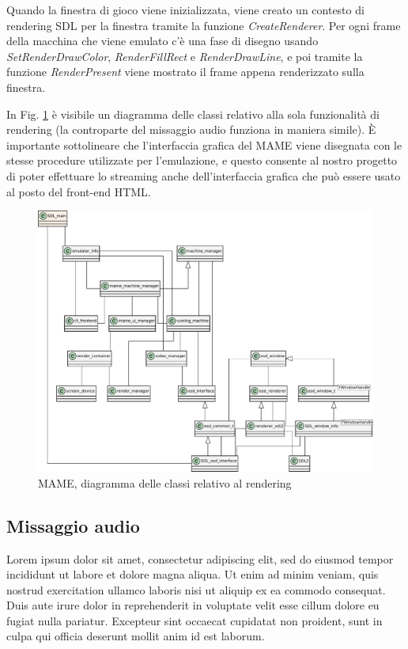Quando la finestra di gioco viene inizializzata, viene creato un contesto di rendering SDL per la finestra tramite la funzione \textit{CreateRenderer}. Per ogni frame della macchina che viene emulato c'è una fase di disegno usando \textit{SetRenderDrawColor}, \textit{RenderFillRect} e \textit{RenderDrawLine}, e poi tramite la funzione \textit{RenderPresent} viene mostrato il frame appena renderizzato sulla finestra.

In Fig. \ref{fig:mame_render_class_diagram} è visibile un diagramma delle classi relativo alla sola funzionalità di rendering (la controparte del missaggio audio funziona in maniera simile). È importante sottolineare che l'interfaccia grafica del MAME viene disegnata con le stesse procedure utilizzate per l'emulazione, e questo consente al nostro progetto di poter effettuare lo streaming anche dell'interfaccia grafica che può essere usato al posto del front-end HTML.

\begin{figure}[H]
	\includegraphics[width=\linewidth]{immagini/mame_render_class_diagram}
	\caption{MAME, diagramma delle classi relativo al rendering}
	\label{fig:mame_render_class_diagram}
\end{figure}


\subsection{Missaggio audio}
Lorem ipsum dolor sit amet, consectetur adipiscing elit, sed do eiusmod tempor incididunt ut labore et dolore magna aliqua. Ut enim ad minim veniam, quis nostrud exercitation ullamco laboris nisi ut aliquip ex ea commodo consequat. Duis aute irure dolor in reprehenderit in voluptate velit esse cillum dolore eu fugiat nulla pariatur. Excepteur sint occaecat cupidatat non proident, sunt in culpa qui officia deserunt mollit anim id est laborum.

